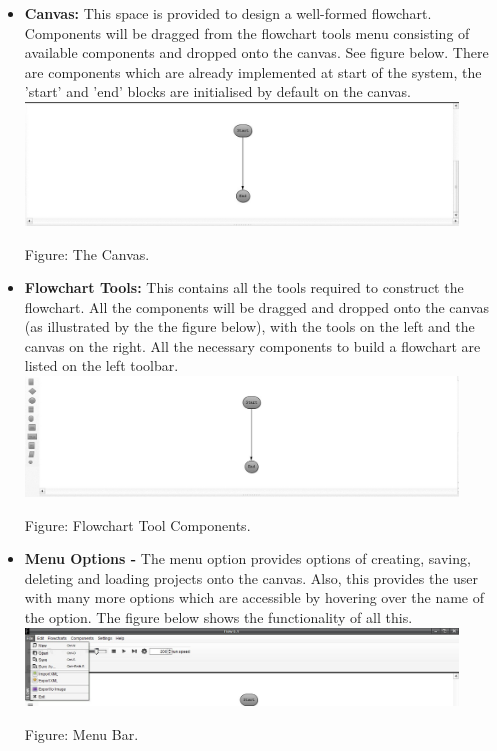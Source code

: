 \documentclass[11pt,a4paper,titlepage]{article}
\begin{document}
		
		\begin{itemize}
			\item \textbf{Canvas:} This space is provided to design a 			well-formed flowchart. Components will be dragged from the flowchart 				tools menu consisting of available components and dropped onto the 				canvas. See figure below.\newline
			There are components which are already implemented at start of the system, the 'start' and 'end' blocks are initialised by default on the canvas.\newline \newline
			\includegraphics[width=11.5cm]{Canvas.jpg}
			\begin{center}
		Figure: The Canvas.\newline
		\end{center}
			
			\item \textbf{Flowchart Tools:} This contains all the tools required to construct the flowchart. All the components will be dragged and dropped onto the canvas (as illustrated by the the figure below), with the tools on the left and the canvas on the right. All the necessary components to build a flowchart are listed on the left toolbar.\newline \newline
			\includegraphics[width=11.5cm]{Tools.jpg}
			\begin{center}
		Figure: Flowchart Tool Components.\newline
		\end{center} 
			
						
			\item \textbf{Menu Options -} The menu option provides options of creating, saving, deleting and loading projects onto the canvas. Also, this provides the user with many more options which are accessible by hovering over the name of the option. The figure below shows the functionality of all this.\newline \newline
			\includegraphics[width=11.5cm]{Menu.jpg}
			\begin{center}
		Figure: Menu Bar.
		\end{center}
			

\end{itemize}
\end{document}
